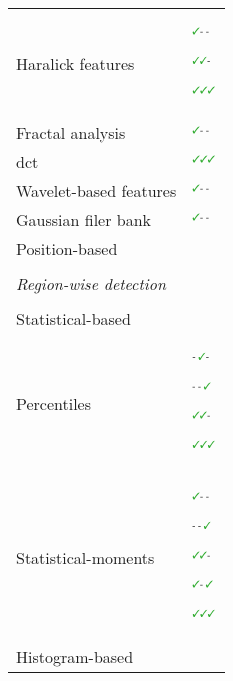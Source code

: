 \begin{table*}
\begin{threeparttable}
\begin{tabular}{p{.5\linewidth} p{.4\linewidth}}
      \quad \quad \quad Haralick features & $^{\text{{\cmarksmall}- -}}$\cite{Antic2013,Tiwari2009a,Tiwari2010,Tiwari2013,Viswanath2008,Viswanath2009,Viswanath2012}\par $^{\text{{\cmarksmall}{\cmarksmall}-}}$\cite{Viswanath2011}\par $^{\text{{\cmarksmall}{\cmarksmall}{\cmarksmall}}}$\cite{Litjens2012,Niaf2011,Niaf2012} \\
      \quad \quad \quad Fractal analysis & $^{\text{{\cmarksmall}- -}}$\cite{Lopes2011,Lv2009} \\
      \quad \quad \quad \Ac{dct} & $^{\text{{\cmarksmall}{\cmarksmall}{\cmarksmall}}}$\cite{Chan2003} \\
      \quad \quad \quad Wavelet-based features & $^{\text{{\cmarksmall}- -}}$\cite{Viswanath2012} \\
      \quad \quad \quad Gaussian filer bank & $^{\text{{\cmarksmall}- -}}$\cite{Litjens2014} \\ 
      \quad \quad Position-based & \cite{Chan2003,Litjens2011,Litjens2012,Litjens2014} \\ \\ [-1.5ex]
      \quad \textit{Region-wise detection} &  \\ \\ [-1.5ex]
      \quad \quad Statistical-based & \\
      \quad \quad \quad Percentiles & $^{\text{- {\cmarksmall}-}}$\cite{Vos2008a} \par $^{\text{- - {\cmarksmall}}}$\cite{Antic2013,Peng2013}\par $^{\text{{\cmarksmall}{\cmarksmall}-}}$\cite{Vos2010}\par $^{\text{{\cmarksmall}{\cmarksmall}{\cmarksmall}}}$\cite{Litjens2011,Litjens2012,Litjens2014,Niaf2011,Niaf2012,Vos2012} \\
      \quad \quad \quad Statistical-moments & $^{\text{{\cmarksmall}- -}}$\cite{Ampeliotis2007,Ampeliotis2008,Tiwari2009a,Tiwari2010,Tiwari2013,Viswanath2008,Viswanath2009,Viswanath2012}\par $^{\text{- - {\cmarksmall}}}$\cite{Antic2013}\par $^{\text{{\cmarksmall}{\cmarksmall}-}}$\cite{Viswanath2011}\par $^{\text{{\cmarksmall}- {\cmarksmall}}}$\cite{Peng2013}\par $^{\text{{\cmarksmall}{\cmarksmall}{\cmarksmall}}}$\cite{Litjens2011,Litjens2012,Litjens2014,Niaf2011,Niaf2012} \\
      \quad \quad Histogram-based & \\

\end{tabular}
\end{threeparttable}
\end{table*}

